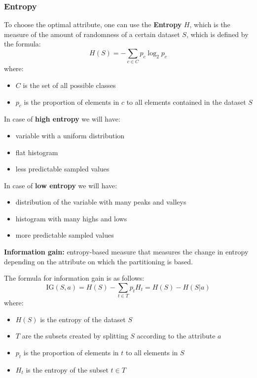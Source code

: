 \subsubsection{Entropy}
To choose the optimal attribute, one can use the \textbf{Entropy} $H$, which is the measure of the amount of randomness of a certain dataset $S$, which is defined by the formula:
\begin{equation} \tag{Entropy}
    H(S) = -\sum_{c \in C} p_c\log_2 p_c
\end{equation}
where:
\begin{itemize}
    \item $C$ is the set of all possible classes
    \item $p_c$ is the proportion of elements in $c$ to all elements contained in the dataset $S$
\end{itemize}
\begin{multicols}{2}
    \raggedright %
    In case of \textbf{high entropy} we will have:
    \begin{itemize}
        \item variable with a uniform distribution
        \item flat histogram
        \item less predictable sampled values
    \end{itemize} 
    \columnbreak
    In case of \textbf{low entropy} we will have:
    \begin{itemize}
        \item distribution of the variable with many peaks and valleys
        \item histogram with many highs and lows
        \item more predictable sampled values
    \end{itemize}
\end{multicols}
\begin{mdframed}
    \textbf{Information gain:} entropy-based measure that measures the change in entropy depending on the attribute on which the partitioning is based.
\end{mdframed}
The formula for information gain is as follows:
\begin{equation} \tag{Information gain}
    \text{IG}(S,a) = H(S) - \sum_{t \in T} p_tH_t = H(S) - H(S|a)
\end{equation}
where:
\begin{itemize}
    \item $H(S)$ is the entropy of the dataset $S$
    \item $T$ are the subsets created by splitting $S$ according to the attribute $a$
    \item $p_t$ is the proportion of elements in $t$ to all elements in $S$
    \item $H_t$ is the entropy of the subset $t \in T$
\end{itemize}

